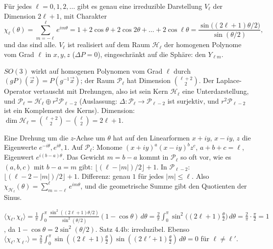 \begin{merksatz}
Für jedes $\ell = 0, 1, 2, \dots$ gibt es genau eine irreduzible Darstellung $V_\ell$ der Dimension $2\ell + 1$, mit Charakter
\[ \chi_\ell(\theta) = \sum_{m = -\ell}^{\ell}e^{im\theta} = 1 + 2\cos\theta + 2\cos2\theta + \dots + 2\cos\ell\theta = \frac{\sin\bigl((2\ell + 1)\theta/2\bigr)}{\sin(\theta/2)} , \]
und das sind alle. $V_\ell$ ist realisiert auf dem Raum $\mathcal H_\ell$ der  homogenen Polynome vom Grad $\ell$ in $x, y, z$ ($\Delta P = 0$), eingeschränkt auf die Sphäre: den  $Y_{\ell m}$.

$SO(3)$ wirkt auf homogenen Polynomen vom Grad $\ell$ durch $(gP)(\vec x) = P(g^{-1}\vec x)$; der Raum $\mathcal P_\ell$ hat Dimension $\binom{\ell + 2}2$. Der Laplace-Operator vertauscht mit Drehungen, also ist sein Kern $\mathcal H_\ell$ eine Unterdarstellung, und $\mathcal P_\ell = \mathcal H_\ell\oplus r^{2}\mathcal P_{\ell - 2}$ (Auslassung: $\Delta\colon\mathcal P_\ell\to\mathcal P_{\ell - 2}$ ist surjektiv, und $r^{2}\mathcal P_{\ell-2}$ ist ein Komplement des Kerns). Dimension: $\dim\mathcal H_\ell = \binom{\ell + 2}2 - \binom\ell2 = 2\ell + 1$.

Eine Drehung um die $z$-Achse um $\theta$ hat auf den Linearformen $x + iy$, $x - iy$, $z$ die Eigenwerte $e^{-i\theta}, e^{i\theta}, 1$. Auf $\mathcal P_\ell$: Monome $(x + iy)^{a}(x - iy)^{b}z^{c}$, $a + b + c = \ell$, Eigenwert $e^{i(b - a)\theta}$. Das Gewicht $m = b - a$ kommt in $\mathcal P_\ell$ so oft vor, wie es $(a, b, c)$ mit $b - a = m$ gibt: $\lfloor(\ell - |m|)/2\rfloor + 1$. In $\mathcal P_{\ell - 2}$: $\lfloor(\ell - 2 - |m|)/2\rfloor + 1$. Differenz: genau $1$ für jedes $|m|\le\ell$. Also $\chi_{\mathcal H_\ell}(\theta) = \sum_{m = -\ell}^{\ell}e^{im\theta}$, und die geometrische Summe gibt den Quotienten der Sinus.

$\langle\chi_\ell, \chi_\ell\rangle = \frac1\pi\int_0^{\pi}\frac{\sin^{2}((2\ell + 1)\theta/2)}{\sin^{2}(\theta/2)}(1 - \cos\theta)\,d\theta = \frac2\pi\int_0^{\pi}\sin^{2}\bigl((2\ell + 1)\tfrac\theta2\bigr)\,d\theta = \frac2\pi\cdot\frac\pi2 = 1$, da $1 - \cos\theta = 2\sin^{2}(\theta/2)$. Satz 4.4b: irreduzibel. Ebenso $\langle\chi_\ell, \chi_{\ell'}\rangle = \frac2\pi\int_0^\pi\sin((2\ell + 1)\frac\theta2)\sin((2\ell' + 1)\frac\theta2)\,d\theta = 0$ für $\ell\neq\ell'$.


\end{merksatz}
